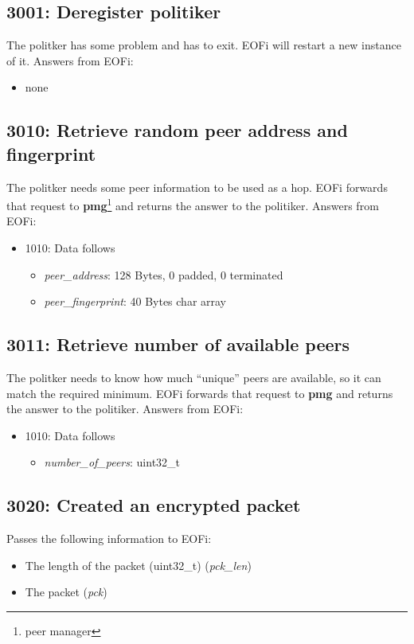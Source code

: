 \documentclass[12pt,a4paper]{book}
\begin{document}
\subsection{3001: Deregister politiker}
The politker has some problem and has to exit. EOFi will restart a new
instance of it.
Answers from EOFi:
\begin{itemize}
\item none
\end{itemize}
\subsection{3010: Retrieve random peer address and fingerprint}
The politker needs some peer information to be used as a hop.
EOFi forwards that request to \textbf{pmg}\footnote{peer manager} and returns
the answer to the politiker.
Answers from EOFi:
\begin{itemize}
\item 1010: Data follows
\begin{itemize}
\item \textit{peer\_address}: 128 Bytes, 0 padded, 0 terminated
\item \textit{peer\_fingerprint}: 40 Bytes char array
\end{itemize}
\end{itemize}
\subsection{3011: Retrieve number of available peers}
The politker needs to know how much "`unique"' peers are available,
so it can match the required minimum.
EOFi forwards that request to \textbf{pmg} and returns the answer to the
politiker.
Answers from EOFi:
\begin{itemize}
\item 1010: Data follows
\begin{itemize}
\item \textit{number\_of\_peers}: uint32\_t
\end{itemize}
\end{itemize}
\subsection{3020: Created an encrypted packet}
Passes the following information to EOFi:
\begin{itemize}
\item The length of the packet (uint32\_t) (\textit{pck\_len})
\item The packet (\textit{pck})
\end{itemize}
\end{document}
